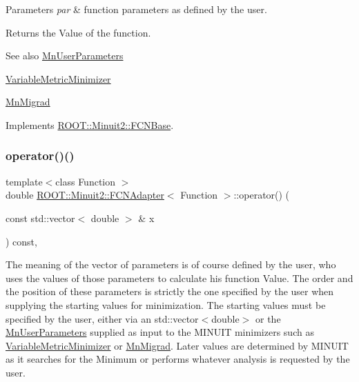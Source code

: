 \begin{DoxyParams}{Parameters}
{\em par} & function parameters as defined by the user.\\
\hline
\end{DoxyParams}
\begin{DoxyReturn}{Returns}
the Value of the function.
\end{DoxyReturn}
\begin{DoxySeeAlso}{See also}
\mbox{\hyperlink{classROOT_1_1Minuit2_1_1MnUserParameters}{Mn\+User\+Parameters}} 

\mbox{\hyperlink{classROOT_1_1Minuit2_1_1VariableMetricMinimizer}{Variable\+Metric\+Minimizer}} 

\mbox{\hyperlink{classROOT_1_1Minuit2_1_1MnMigrad}{Mn\+Migrad}} 
\end{DoxySeeAlso}


Implements \mbox{\hyperlink{classROOT_1_1Minuit2_1_1FCNBase_ae4a86bd94d0d0f5ca6fc8f8ab2bb43cd}{R\+O\+O\+T\+::\+Minuit2\+::\+F\+C\+N\+Base}}.

\mbox{\label{classROOT_1_1Minuit2_1_1FCNAdapter_a3d400764a6828594b68a00b905d450b2}} 
\subsubsection{\texorpdfstring{operator()()}{operator()()}\hspace{0.1cm}{\footnotesize\ttfamily [2/4]}}
{\footnotesize\ttfamily template$<$class Function $>$ \\
double \mbox{\hyperlink{classROOT_1_1Minuit2_1_1FCNAdapter}{R\+O\+O\+T\+::\+Minuit2\+::\+F\+C\+N\+Adapter}}$<$ Function $>$\+::operator() (\begin{DoxyParamCaption}\item[{const std\+::vector$<$ double $>$ \&}]{x }\end{DoxyParamCaption}) const\hspace{0.3cm}{\ttfamily [inline]}, {\ttfamily [virtual]}}

The meaning of the vector of parameters is of course defined by the user, who uses the values of those parameters to calculate his function Value. The order and the position of these parameters is strictly the one specified by the user when supplying the starting values for minimization. The starting values must be specified by the user, either via an std\+::vector$<$double$>$ or the \mbox{\hyperlink{classROOT_1_1Minuit2_1_1MnUserParameters}{Mn\+User\+Parameters}} supplied as input to the M\+I\+N\+U\+IT minimizers such as \mbox{\hyperlink{classROOT_1_1Minuit2_1_1VariableMetricMinimizer}{Variable\+Metric\+Minimizer}} or \mbox{\hyperlink{classROOT_1_1Minuit2_1_1MnMigrad}{Mn\+Migrad}}. Later values are determined by M\+I\+N\+U\+IT as it searches for the Minimum or performs whatever analysis is requested by the user.


